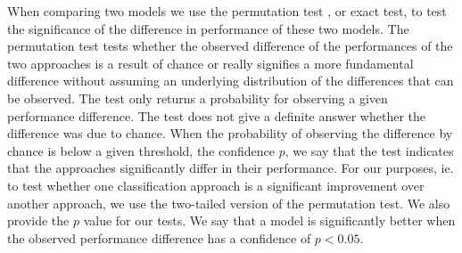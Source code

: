 When comparing two models we use the permutation test \cite{Fisher1925}, or exact test, to test the significance of the difference in performance of these two models.
The permutation test tests whether the observed difference of the performances of the two approaches is a result of chance or really signifies a more fundamental difference without assuming an underlying distribution of the differences that can be observed.
The test only returns a probability for observing a given performance difference. The test does not give a definite answer whether the difference was due to chance.
When the probability of observing the difference by chance is below a given threshold, the confidence $p$, we say that the test indicates that the approaches significantly differ in their performance.
For our purposes, ie. to test whether one classification approach is a significant improvement over another approach, we use the two-tailed version \cite{Kock2015} of the permutation test.
We also provide the $p$ value for our tests.
We say that a model is significantly better when the observed performance difference has a confidence of $p < 0.05$.

